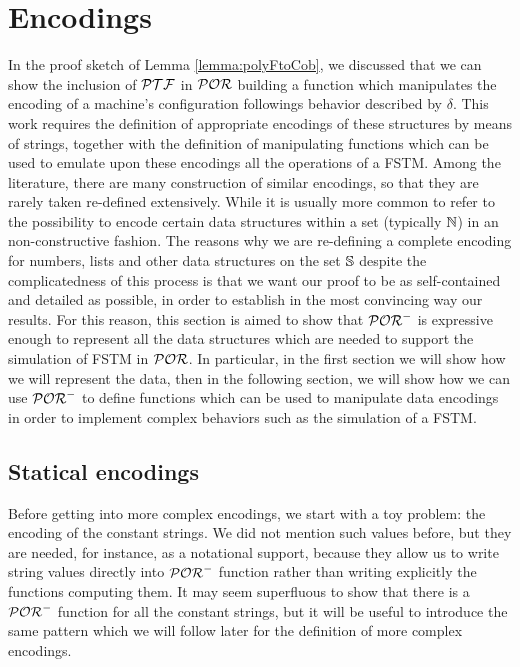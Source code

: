 \section{Encodings}
\label{sub:encoding}
In the proof sketch of Lemma \ref{lemma:polyFtoCob}, we discussed that we can
show the inclusion of $\mathcal{PTF}$ in $\mathcal{POR}$ building a function which
manipulates the encoding of a machine's configuration followings
behavior described by $\delta$.
This work requires the definition of appropriate encodings
of these structures by means of strings, together with the
definition of manipulating functions which can be used to
emulate upon these encodings all the operations of a FSTM.
%
Among the literature, there are many construction of similar
encodings, so that they are rarely taken re-defined extensively.
While it is usually more common to refer to the possibility to
encode certain data structures within a set (typically $\mathbb{N}$)
in an non-constructive fashion.
%
The reasons why we are re-defining a complete encoding for numbers,
lists and other data structures on the set $\mathbb{S}$
despite the complicatedness of this process is that
we want our proof to be as self-contained and
detailed as possible, in order to establish in the most
convincing way our results.
%
For this reason, this section is aimed to
show that $\mathcal{POR}^-$ is expressive enough to represent all the data
structures which are needed to support the simulation of FSTM in $\mathcal{POR}$.
%
In particular, in the first section we will show
how we will represent the data, then in the following section,
we will show how we can use $\mathcal{POR}^-$ to define functions
which can be used to manipulate data encodings in order to
implement complex behaviors such as the simulation of a FSTM.

\subsection{Statical encodings}
\label{subsub:encodings}


Before getting into more complex encodings, we start with a toy problem:
the encoding of the constant strings. We did not mention such values before,
but they are needed, for instance, as a notational support,
because they allow us to write string values directly into $\mathcal{POR}^-$ function
rather than writing explicitly the functions computing them.
It may seem superfluous
to show that there is a $\mathcal{POR}^-$ function for all the constant strings,
but it will be useful to
introduce the same pattern which we will follow later for the definition of more
complex encodings.

